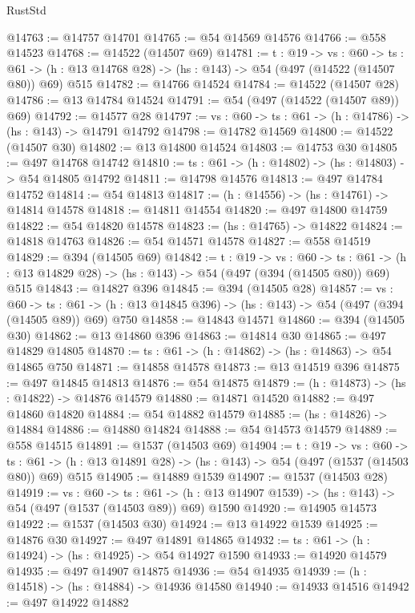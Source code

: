 \begin{lexlean}{RustStd}
\begin{coremodule}
@14763 := @14757 @14701
@14765 := @54 @14569 @14576
@14766 := @558 @14523
@14768 := @14522 (@14507 @69)
@14781 := {t : @19} ->
  {vs : @60} ->
  {ts : @61} -> (h : @13 @14768 @28) -> (hs : @143) -> @54 (@497 (@14522 (@14507 @80)) @69) @515
@14782 := @14766 @14524
@14784 := @14522 (@14507 @28)
@14786 := @13 @14784 @14524
@14791 := @54 (@497 (@14522 (@14507 @89)) @69)
@14792 := @14577 @28
@14797 := {vs : @60} -> {ts : @61} -> (h : @14786) -> (hs : @143) -> @14791 @14792
@14798 := @14782 @14569
@14800 := @14522 (@14507 @30)
@14802 := @13 @14800 @14524
@14803 := @14753 @30
@14805 := @497 @14768 @14742
@14810 := {ts : @61} -> (h : @14802) -> (hs : @14803) -> @54 @14805 @14792
@14811 := @14798 @14576
@14813 := @497 @14784 @14752
@14814 := @54 @14813
@14817 := (h : @14556) -> (hs : @14761) -> @14814 @14578
@14818 := @14811 @14554
@14820 := @497 @14800 @14759
@14822 := @54 @14820 @14578
@14823 := (hs : @14765) -> @14822
@14824 := @14818 @14763
@14826 := @54 @14571 @14578
@14827 := @558 @14519
@14829 := @394 (@14505 @69)
@14842 := {t : @19} ->
  {vs : @60} ->
  {ts : @61} -> (h : @13 @14829 @28) -> (hs : @143) -> @54 (@497 (@394 (@14505 @80)) @69) @515
@14843 := @14827 @396
@14845 := @394 (@14505 @28)
@14857 := {vs : @60} ->
  {ts : @61} -> (h : @13 @14845 @396) -> (hs : @143) -> @54 (@497 (@394 (@14505 @89)) @69) @750
@14858 := @14843 @14571
@14860 := @394 (@14505 @30)
@14862 := @13 @14860 @396
@14863 := @14814 @30
@14865 := @497 @14829 @14805
@14870 := {ts : @61} -> (h : @14862) -> (hs : @14863) -> @54 @14865 @750
@14871 := @14858 @14578
@14873 := @13 @14519 @396
@14875 := @497 @14845 @14813
@14876 := @54 @14875
@14879 := (h : @14873) -> (hs : @14822) -> @14876 @14579
@14880 := @14871 @14520
@14882 := @497 @14860 @14820
@14884 := @54 @14882 @14579
@14885 := (hs : @14826) -> @14884
@14886 := @14880 @14824
@14888 := @54 @14573 @14579
@14889 := @558 @14515
@14891 := @1537 (@14503 @69)
@14904 := {t : @19} ->
  {vs : @60} ->
  {ts : @61} -> (h : @13 @14891 @28) -> (hs : @143) -> @54 (@497 (@1537 (@14503 @80)) @69) @515
@14905 := @14889 @1539
@14907 := @1537 (@14503 @28)
@14919 := {vs : @60} ->
  {ts : @61} -> (h : @13 @14907 @1539) -> (hs : @143) -> @54 (@497 (@1537 (@14503 @89)) @69) @1590
@14920 := @14905 @14573
@14922 := @1537 (@14503 @30)
@14924 := @13 @14922 @1539
@14925 := @14876 @30
@14927 := @497 @14891 @14865
@14932 := {ts : @61} -> (h : @14924) -> (hs : @14925) -> @54 @14927 @1590
@14933 := @14920 @14579
@14935 := @497 @14907 @14875
@14936 := @54 @14935
@14939 := (h : @14518) -> (hs : @14884) -> @14936 @14580
@14940 := @14933 @14516
@14942 := @497 @14922 @14882

\end{coremodule}
\end{lexlean}
